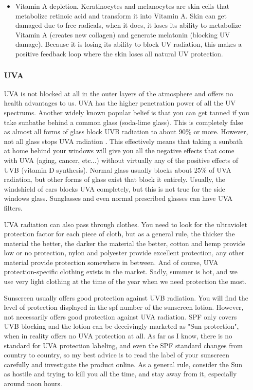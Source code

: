 \begin{itemize}
\item
Vitamin A depletion. Keratinocytes and melanocytes are skin cells that metabolize retinoic acid and transform it into  Vitamin A. Skin can get damaged due to free radicals, when it does, it loses its ability to metabolize Vitamin A (creates new collagen) and generate melatonin (blocking UV damage). Because it is losing its ability to block UV radiation, this makes a positive feedback loop where the skin loses all natural UV protection. 

\end{itemize}

\subsubsection{UVA}

UVA is not blocked at all in the outer layers of the atmosphere and offers no health advantages to us. UVA has the higher penetration power of all the UV spectrums. Another widely known popular belief is that you can get tanned if you take sunbathe behind a common glass (soda-lime glass). This is completely false as almost all forms of glass block UVB radiation to about 90\% or more. However, not all glass stops UVA radiation \cite{ref:Duarte2009}. This effectively means that taking a sunbath at home behind your windows will give you all the negative effects that come with UVA (aging, cancer, etc...) without virtually any of the positive effects of UVB (vitamin D synthesis). Normal glass usually blocks about 25\% of UVA radiation, but other forms of glass exist that block it entirely. Usually, the windshield of cars blocks UVA completely, but this is not true for the side windows glass. Sunglasses and even normal prescribed glasses can have UVA filters.

UVA radiation can also pass through clothes. You need to look for the ultraviolet protection factor for each piece of cloth, but as a general rule, the thicker the material the better, the darker the material the better, cotton and hemp provide low or no protection, nylon and polyester provide excellent protection, any other material provide protection somewhere in between. And of course, UVA protection-specific clothing exists in the market. Sadly, summer is hot, and we use very light clothing at the time of the year when we need protection the most.

Sunscreen usually offers good protection against UVB radiation. You will find the level of protection displayed in the \gls{spf} number of the sunscreen lotion. However, not necessarily offers good protection against UVA radiation. SPF only covers UVB blocking and the lotion can be deceivingly marketed as "Sun protection", when in reality offers no UVA protection at all. As far as I know, there is no standard for UVA protection labeling, and even the SPF standard changes from country to country, so my best advice is to read the label of your sunscreen carefully and investigate the product online. As a general rule, consider the Sun as hostile and trying to kill you all the time, and stay away from it, especially around noon hours.


